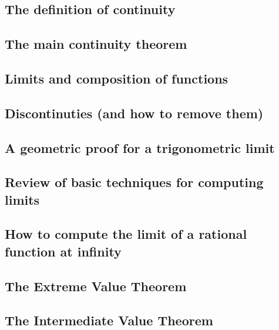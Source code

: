 \subsection{The definition of continuity}
\subsection{The main continuity theorem}
\subsection{Limits and composition of functions}
\subsection{Discontinuties (and how to remove them)}
\subsection{A geometric proof for a trigonometric limit}
\subsection{Review of basic techniques for computing limits}
\subsection{How to compute the limit of a rational function at infinity}
\subsection{The Extreme Value Theorem}
\subsection{The Intermediate Value Theorem}
